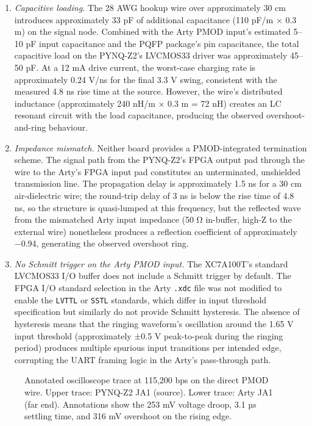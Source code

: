 \begin{enumerate}
  \item \textit{Capacitive loading.} The 28 AWG hookup wire over approximately 30 cm introduces approximately 33 pF of additional capacitance (110 pF/m × 0.3 m) on the signal node. Combined with the Arty PMOD input's estimated 5–10 pF input capacitance and the PQFP package's pin capacitance, the total capacitive load on the PYNQ-Z2's LVCMOS33 driver was approximately 45–50 pF. At a 12 mA drive current, the worst-case charging rate is approximately 0.24 V/ns for the final 3.3 V swing, consistent with the measured 4.8 ns rise time at the source. However, the wire's distributed inductance (approximately 240 nH/m × 0.3 m = 72 nH) creates an LC resonant circuit with the load capacitance, producing the observed overshoot-and-ring behaviour.
  \item \textit{Impedance mismatch.} Neither board provides a PMOD-integrated termination scheme. The signal path from the PYNQ-Z2's FPGA output pad through the wire to the Arty's FPGA input pad constitutes an unterminated, unshielded transmission line. The propagation delay is approximately 1.5 ns for a 30 cm air-dielectric wire; the round-trip delay of 3 ns is below the rise time of 4.8 ns, so the structure is quasi-lumped at this frequency, but the reflected wave from the mismatched Arty input impedance (50 Ω in-buffer, high-Z to the external wire) nonetheless produces a reflection coefficient of approximately −0.94, generating the observed overshoot ring.
  \item \textit{No Schmitt trigger on the Arty PMOD input.} The XC7A100T's standard LVCMOS33 I/O buffer does not include a Schmitt trigger by default. The FPGA I/O standard selection in the Arty \texttt{.xdc} file was not modified to enable the \texttt{LVTTL} or \texttt{SSTL} standards, which differ in input threshold specification but similarly do not provide Schmitt hysteresis. The absence of hysteresis means that the ringing waveform's oscillation around the 1.65 V input threshold (approximately ±0.5 V peak-to-peak during the ringing period) produces multiple spurious input transitions per intended edge, corrupting the UART framing logic in the Arty's pass-through path.
\end{enumerate}
\begin{figure}[htbp]
\centering
{}
\caption{Annotated oscilloscope trace at 115,200 bps on the direct PMOD wire. Upper trace: PYNQ-Z2 JA1 (source). Lower trace: Arty JA1 (far end). Annotations show the 253 mV voltage droop, 3.1 µs settling time, and 316 mV overshoot on the rising edge.}
\end{figure}

